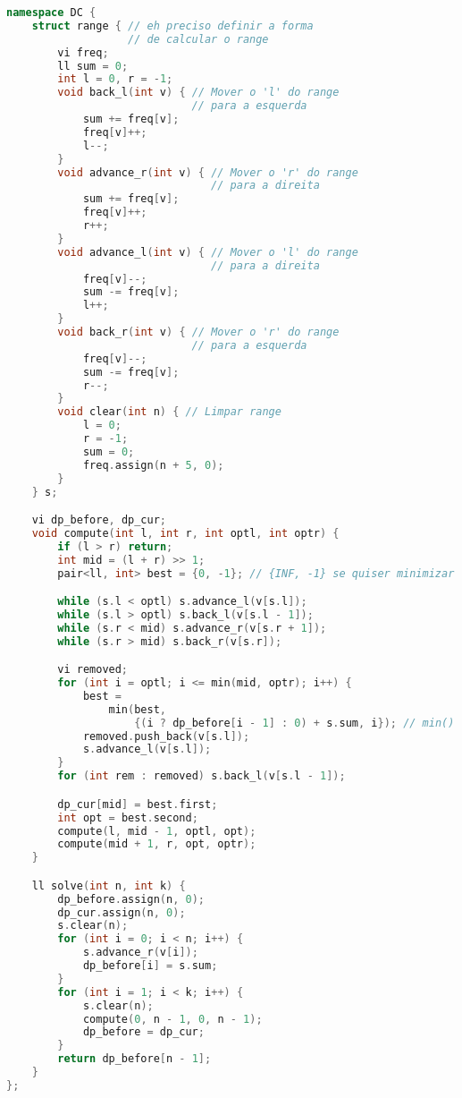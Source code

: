 \documentclass[10pt, a4paper, oneside]{book}
\begin{document}
\begin{lstlisting}[language=C++]
namespace DC {
    struct range { // eh preciso definir a forma
                   // de calcular o range
        vi freq;
        ll sum = 0;
        int l = 0, r = -1;
        void back_l(int v) { // Mover o 'l' do range
                             // para a esquerda
            sum += freq[v];
            freq[v]++;
            l--;
        }
        void advance_r(int v) { // Mover o 'r' do range
                                // para a direita
            sum += freq[v];
            freq[v]++;
            r++;
        }
        void advance_l(int v) { // Mover o 'l' do range
                                // para a direita
            freq[v]--;
            sum -= freq[v];
            l++;
        }
        void back_r(int v) { // Mover o 'r' do range
                             // para a esquerda
            freq[v]--;
            sum -= freq[v];
            r--;
        }
        void clear(int n) { // Limpar range
            l = 0;
            r = -1;
            sum = 0;
            freq.assign(n + 5, 0);
        }
    } s;

    vi dp_before, dp_cur;
    void compute(int l, int r, int optl, int optr) {
        if (l > r) return;
        int mid = (l + r) >> 1;
        pair<ll, int> best = {0, -1}; // {INF, -1} se quiser minimizar

        while (s.l < optl) s.advance_l(v[s.l]);
        while (s.l > optl) s.back_l(v[s.l - 1]);
        while (s.r < mid) s.advance_r(v[s.r + 1]);
        while (s.r > mid) s.back_r(v[s.r]);

        vi removed;
        for (int i = optl; i <= min(mid, optr); i++) {
            best =
                min(best,
                    {(i ? dp_before[i - 1] : 0) + s.sum, i}); // min() se quiser minimizar
            removed.push_back(v[s.l]);
            s.advance_l(v[s.l]);
        }
        for (int rem : removed) s.back_l(v[s.l - 1]);

        dp_cur[mid] = best.first;
        int opt = best.second;
        compute(l, mid - 1, optl, opt);
        compute(mid + 1, r, opt, optr);
    }

    ll solve(int n, int k) {
        dp_before.assign(n, 0);
        dp_cur.assign(n, 0);
        s.clear(n);
        for (int i = 0; i < n; i++) {
            s.advance_r(v[i]);
            dp_before[i] = s.sum;
        }
        for (int i = 1; i < k; i++) {
            s.clear(n);
            compute(0, n - 1, 0, n - 1);
            dp_before = dp_cur;
        }
        return dp_before[n - 1];
    }
};
\end{lstlisting}
\hfill
\end{document}
